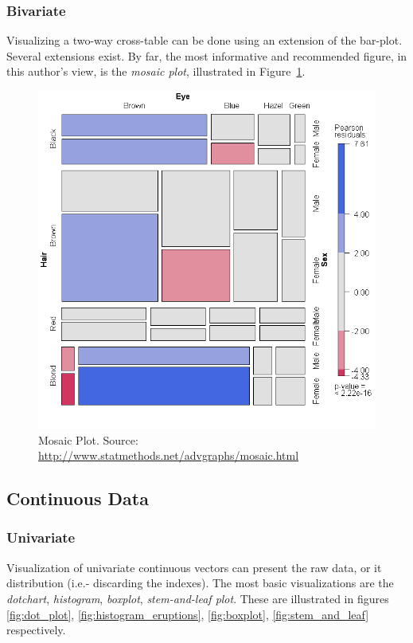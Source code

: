 \documentclass[12pt,a4paper]{report}
\begin{document}
\subsubsection{Bivariate}
Visualizing a two-way cross-table can be done using an extension of the bar-plot.
Several extensions exist. By far, the most informative and recommended figure, in this author's view, is the \emph{mosaic plot}, illustrated in Figure~\ref{fig:mosaic}. 

\begin{figure}
\centering
\includegraphics[height=0.3\textheight]{art/mosaic1}
\caption[Mosaic Plot]{Mosaic Plot. Source: \url{http://www.statmethods.net/advgraphs/mosaic.html}}
\label{fig:mosaic}
\end{figure}



\subsection{Continuous Data}




\subsubsection{Univariate}
Visualization of univariate continuous vectors can present the raw data, or it distribution (i.e.- discarding the indexes).
The most basic visualizations are the \emph{dotchart}, \emph{histogram}, \emph{boxplot}, \emph{stem-and-leaf plot}. 
These are illustrated in figures \ref{fig:dot_plot}, \ref{fig:histogram_eruptions}, \ref{fig:boxplot}, \ref{fig:stem_and_leaf} respectively. 
\end{document}
